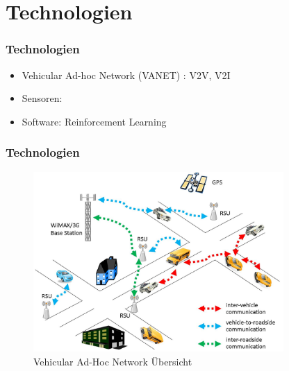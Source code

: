 \section{Technologien}

\begin{frame}
    \frametitle{Technologien}

    \begin{itemize}
        \item Vehicular Ad-hoc Network (VANET) \cite{10.1007/978-3-642-31368-4_6}: V2V, V2I
        \item Sensoren:
        \item Software: Reinforcement Learning
    \end{itemize}

\end{frame}

\begin{frame}
    \frametitle{Technologien}

    \begin{figure}[H]
        \centering
        \includegraphics[width=0.85\textwidth]{resources/images/VANET.jpg}
        \caption{Vehicular Ad-Hoc Network Übersicht \cite{vanet1_img}}
    \end{figure}
\end{frame}